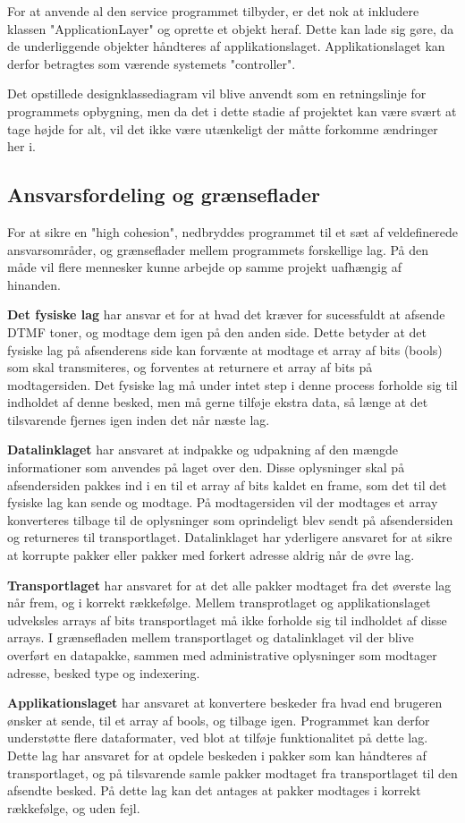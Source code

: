 For at anvende al den service programmet tilbyder, er det nok at inkludere klassen "ApplicationLayer" og oprette et objekt heraf. Dette kan lade sig gøre, da de underliggende objekter håndteres af applikationslaget. Applikationslaget kan derfor betragtes som værende systemets "controller".

Det opstillede designklassediagram vil blive anvendt som en retningslinje for programmets opbygning, men da det i dette stadie af projektet kan være svært at tage højde for alt, vil det ikke være utænkeligt der måtte forkomme ændringer her i.


\subsection{Ansvarsfordeling og grænseflader}
For at sikre en "high cohesion", nedbryddes programmet til et sæt af veldefinerede ansvarsområder, og grænseflader mellem programmets forskellige lag. På den måde vil flere mennesker kunne arbejde op samme projekt uafhængig af hinanden.  

\textbf{Det fysiske lag} har ansvar et for at hvad det kræver for sucessfuldt at afsende DTMF toner, og modtage dem igen på den anden side. Dette betyder at det fysiske lag på afsenderens side kan forvænte at modtage et array af bits (bools) som skal transmiteres, og forventes at returnere et array af bits på modtagersiden. Det fysiske lag må under intet step i denne process forholde sig til indholdet af denne besked, men må gerne tilføje ekstra data, så længe at det tilsvarende fjernes igen inden det når næste lag.

\textbf{Datalinklaget} har ansvaret at indpakke og udpakning af den mængde informationer som anvendes på laget over den. Disse oplysninger skal på afsendersiden pakkes ind i en til et array af bits kaldet en frame, som det til det fysiske lag kan sende og modtage. På modtagersiden vil der modtages et array  konverteres tilbage til de oplysninger som oprindeligt blev sendt på afsendersiden og returneres til transportlaget. 
Datalinklaget har yderligere ansvaret for at sikre at korrupte pakker eller pakker med forkert adresse aldrig når de øvre lag.

\textbf{Transportlaget} har ansvaret for at det alle pakker modtaget fra det øverste lag  når frem, og i korrekt rækkefølge. Mellem transprotlaget og applikationslaget udveksles arrays af bits transportlaget må ikke forholde sig til indholdet af disse arrays. I grænsefladen mellem transportlaget og datalinklaget vil der blive overført en datapakke, sammen med administrative oplysninger som modtager adresse, besked type og indexering. 

\textbf{Applikationslaget} har ansvaret at konvertere beskeder fra hvad end brugeren ønsker at sende, til et array af bools, og tilbage igen. Programmet kan derfor understøtte flere dataformater, ved blot at tilføje funktionalitet på dette lag. 
Dette lag har ansvaret for at opdele beskeden i pakker som kan håndteres af transportlaget, og på tilsvarende samle pakker modtaget fra transportlaget til den afsendte besked. På dette lag kan det antages at pakker modtages i korrekt rækkefølge, og uden fejl. 






